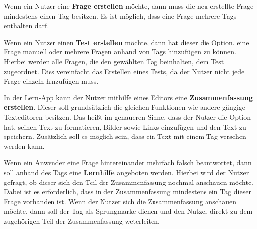 \noindent
Wenn ein Nutzer eine \textbf{Frage erstellen} möchte, dann muss die neu erstellte Frage mindestens einen Tag besitzen. Es ist möglich, dass eine Frage mehrere Tags enthalten darf. \newline

\noindent
Wenn ein Nutzer einen \textbf{Test erstellen} möchte, dann hat dieser die Option, eine Frage manuell oder mehrere Fragen anhand von Tags hinzufügen zu können. Hierbei werden alle Fragen, die den gewählten Tag beinhalten, dem Test zugeordnet. Dies vereinfacht das Erstellen eines Tests, da der Nutzer nicht jede Frage einzeln hinzufügen muss. \newline

\noindent
In der Lern-App kann der Nutzer mithilfe eines Editors eine \textbf{Zusammenfassung erstellen}. Dieser soll grundsätzlich die gleichen Funktionen wie andere gängige Texteditoren besitzen. Das heißt im genaueren Sinne, dass der Nutzer die Option hat, seinen Text zu formatieren, Bilder sowie Links einzufügen und den Text zu speichern. Zusätzlich soll es möglich sein, dass ein Text mit einem Tag versehen werden kann. \newline 

\noindent
Wenn ein Anwender eine Frage hintereinander mehrfach falsch beantwortet, dann soll anhand des Tags eine \textbf{Lernhilfe} angeboten werden. Hierbei wird der Nutzer gefragt, ob dieser sich den Teil der Zusammenfassung nochmal anschauen möchte. Dabei ist es erforderlich, dass in der Zusammenfassung mindestens ein Tag dieser Frage vorhanden ist. Wenn der Nutzer sich die Zusammenfassung anschauen möchte, dann soll der Tag als Sprungmarke dienen und den Nutzer direkt zu dem zugehörigen Teil der Zusammenfassung weterleiten. \newline 

